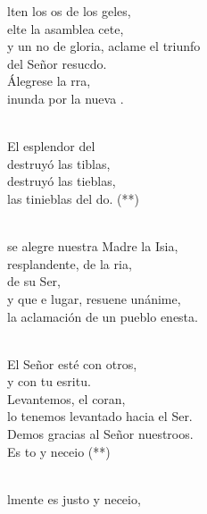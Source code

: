 \begin{cancion}%
	lten los os de los geles,\\
	elte la asamblea cete,\\
	y un no de gloria, aclame el triunfo\\
	del Señor resucdo.\\
	Álegrese la rra,\\
	inunda por la nueva .\\\jump\\
	\begin{chorus}%
	El esplendor del \\
	destruyó las tiblas,\\
	destruyó las tieblas,\\
	las tinieblas del do. (**)\\
	\end{chorus}%
	\jump\\
	 se alegre nuestra Madre la Isia,\\
	resplandente, de la ria,\\
	de su Ser,\\
	y que e lugar, resuene unánime,\\
	la aclamación de un pueblo enesta.\\\jump\\
	\begin{chorus}%
	El Señor esté con otros,\\
	y con tu esritu.\\
	Levantemos, el coran,\\
	lo tenemos levantado hacia el Ser.\\
	Demos gracias al Señor nuestroos.\\
\jump
	Es to y neceio (**)\\
	\end{chorus}%
	\jump\\
	lmente es justo y neceio,\\

\end{cancion}
